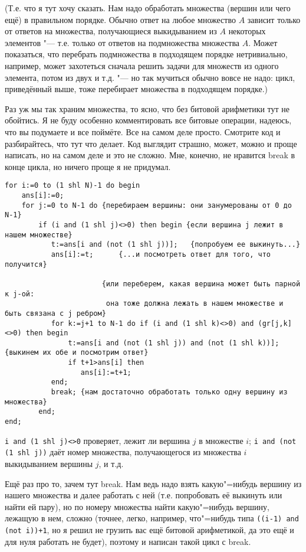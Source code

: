 (Т.е. что я тут хочу сказать. Нам надо обработать множества (вершин или чего ещё) в правильном
порядке. Обычно ответ на любое множество $A$ зависит только от ответов на множества, получающиеся
выкидыванием из $A$ некоторых элементов "--- т.е. только от ответов на подмножества множества $A$.
Может показаться, что перебрать подмножества в подходящем порядке нетривиально, например,
может захотеться сначала решить задачи для множеств из одного элемента, потом из двух и т.д. "--- но
так мучиться обычно вовсе не надо: цикл, приведённый выше, тоже перебирает множества в подходящем
порядке.)

Раз уж мы так храним множества, то ясно, что без битовой арифметики тут не обойтись. Я не буду особенно комментировать
все битовые операции, надеюсь, что вы подумаете и все поймёте. Все на самом деле просто.
Смотрите код и разбирайтесь, что тут что делает. Код выглядит страшно, может, можно и проще написать,
но на самом деле и это не сложно. Мне, конечно, не нравится break в конце цикла, но ничего проще я не придумал.

\begin{codesampleo}\begin{verbatim}
for i:=0 to (1 shl N)-1 do begin
    ans[i]:=0;
    for j:=0 to N-1 do {перебираем вершины: они занумерованы от 0 до N-1}
        if (i and (1 shl j)<>0) then begin {если вершина j лежит в нашем множестве}
           t:=ans[i and (not (1 shl j))];   {попробуем ее выкинуть...}
           ans[i]:=t;      {...и посмотреть ответ для того, что получится}
           
                       {или переберем, какая вершина может быть парной к j-ой: 
                        она тоже должна лежать в нашем множестве и быть связана с j ребром}
           for k:=j+1 to N-1 do if (i and (1 shl k)<>0) and (gr[j,k]<>0) then begin 
               t:=ans[i and (not (1 shl j)) and (not (1 shl k))];   {выкинем их обе и посмотрим ответ}
               if t+1>ans[i] then
                  ans[i]:=t+1;
           end;
           break; {нам достаточно обработать только одну вершину из множества}
        end;
end;
\end{verbatim}\end{codesampleo}
\verb|i and (1 shl j)<>0| проверяет, лежит ли вершина $j$ в множестве $i$;
\verb|i and (not (1 shl j))| даёт номер множества, получающегося из множества $i$ выкидыванием вершины $j$, и т.д.

Ещё раз про то, зачем тут break. Нам ведь надо взять какую"=нибудь вершину из нашего множества и далее работать с ней
(т.е. попробовать её выкинуть или найти ей пару), но по номеру множества найти какую"=нибудь вершину, лежащую в нем, 
сложно (точнее, легко, например, что"=нибудь типа \texttt{((i-1) and (not i))+1}, но я решил не грузить вас
ещё битовой арифметикой, да это ещё и для нуля работать не будет), поэтому и написан такой цикл с
break.

